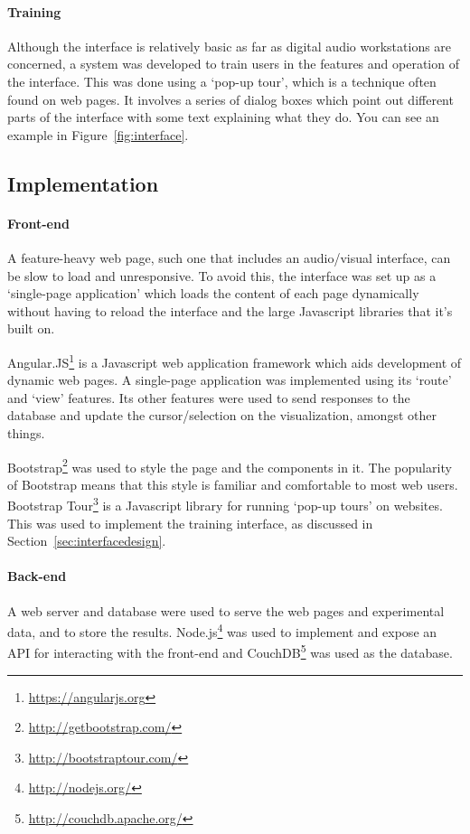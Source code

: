 \paragraph{Training}
Although the interface is relatively basic as far as digital audio workstations
are concerned, a system was developed to train users in the features and
operation of the interface. This was done using a `pop-up tour', which is
a technique often found on web pages. It involves a series of dialog boxes
which point out different parts of the interface with some text explaining what
they do. You can see an example in Figure~\ref{fig:interface}.

\subsection{Implementation}

\paragraph{Front-end}
A feature-heavy web page, such one that includes an audio/visual interface, can
be slow to load and unresponsive. To avoid this, the interface was set up as a
`single-page application' which loads the content of each page dynamically
without having to reload the interface and the large Javascript libraries that
it's built on.

Angular.JS\footnote{\url{https://angularjs.org}} is a Javascript web
application framework which aids development of dynamic web pages. A
single-page application was implemented using its `route' and `view' features.
Its other features were used to send responses to the database and update the
cursor/selection on the visualization, amongst other things.

Bootstrap\footnote{\url{http://getbootstrap.com/}} was used to style the page
and the components in it. The popularity of Bootstrap means that this style is
familiar and comfortable to most web users. Bootstrap
Tour\footnote{\url{http://bootstraptour.com/}} is a Javascript library for
running `pop-up tours' on websites. This was used to implement the training
interface, as discussed in Section~\ref{sec:interfacedesign}.

\paragraph{Back-end}
A web server and database were used to serve the web pages and experimental
data, and to store the results. Node.js\footnote{\url{http://nodejs.org/}} was
used to implement and expose an API for interacting with the front-end and
CouchDB\footnote{\url{http://couchdb.apache.org/}} was used as the database.

